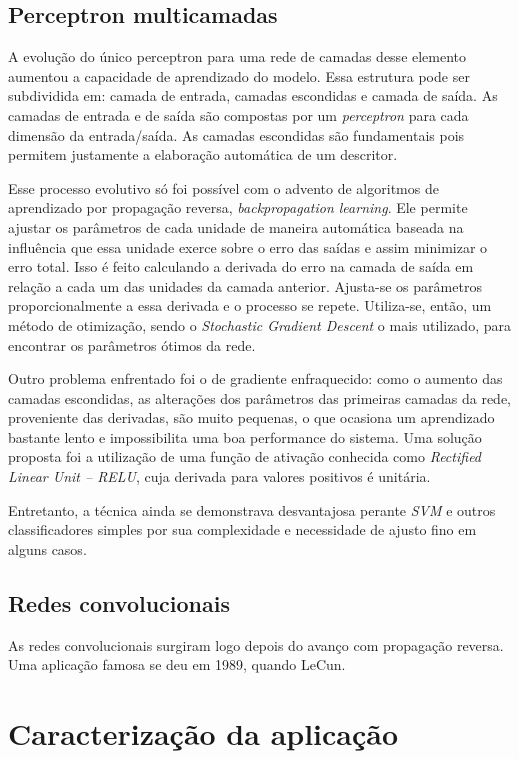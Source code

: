 \subsection{Perceptron multicamadas}
A evolução do único perceptron para uma rede de camadas desse elemento aumentou a capacidade de aprendizado do modelo. Essa estrutura pode ser subdividida em: camada de entrada, camadas escondidas e camada de saída. As camadas de entrada e de saída são compostas por um \textit{perceptron} para cada dimensão da entrada/saída. As camadas escondidas são fundamentais pois permitem justamente a elaboração automática de um descritor.

Esse processo evolutivo só foi possível com o advento de algoritmos de aprendizado por propagação reversa, \textit{backpropagation learning}. Ele  permite ajustar os parâmetros de cada unidade de maneira automática baseada na influência que essa unidade exerce sobre o erro das saídas e assim minimizar o erro total. Isso é feito calculando a derivada do erro na camada de saída em relação a cada um das unidades da camada anterior. Ajusta-se os parâmetros proporcionalmente a essa derivada e o processo se repete. Utiliza-se, então, um método de otimização, sendo o \textit{Stochastic Gradient Descent} o mais utilizado, para encontrar os parâmetros ótimos da rede.

Outro problema enfrentado foi o de gradiente enfraquecido: como o aumento das camadas escondidas, as alterações dos parâmetros das primeiras camadas da rede, proveniente das derivadas, são muito pequenas, o que ocasiona um aprendizado bastante lento e impossibilita uma boa performance do sistema. Uma solução proposta foi a utilização de uma função de ativação conhecida como \textit{Rectified Linear Unit -- RELU}, cuja derivada para valores positivos é unitária. 

Entretanto, a técnica ainda se demonstrava desvantajosa perante \textit{SVM} e outros classificadores simples por sua complexidade e necessidade de ajusto fino em alguns casos. 

\subsection{Redes convolucionais}
As redes convolucionais surgiram logo depois do avanço com propagação reversa. Uma aplicação famosa se deu em 1989, quando LeCun.

\section{Caracterização da aplicação}


